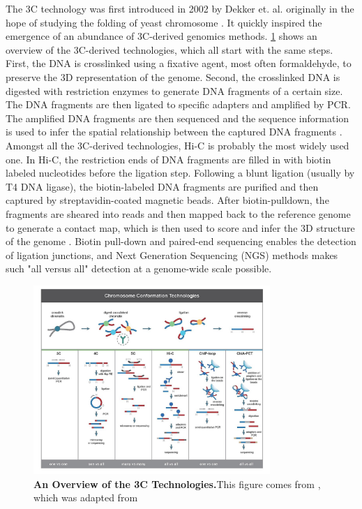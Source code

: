 \documentclass[11pt]{article}
\begin{document}
The 3C technology was first introduced in 2002 by Dekker et. al. originally in the hope of studying the folding of yeast chromosome \cite{dekker_capturing_2002}. It quickly inspired the emergence of an abundance of 3C-derived genomics methods. \cref{fig:3C} shows an overview of the 3C-derived technologies, which all start with the same steps. First, the DNA is crosslinked using a fixative agent, most often formaldehyde, to preserve the 3D representation of the genome. Second, the crosslinked DNA is digested with restriction enzymes to generate DNA fragments of a certain size. The DNA fragments are then ligated to specific adapters and amplified by PCR. The amplified DNA fragments are then sequenced and the sequence information is used to infer the spatial relationship between the captured DNA fragments \cite{wit_decade_2012}. Amongst all the 3C-derived technologies, Hi-C is probably the most widely used one. In Hi-C, the restriction ends of DNA fragments are filled in with biotin labeled nucleotides before the ligation step. Following a blunt ligation (usually by T4 DNA ligase), the biotin-labeled DNA fragments are purified and then captured by streptavidin-coated magnetic beads. After biotin-pulldown, the fragments are sheared into reads and then mapped back to the reference genome to generate a contact map, which is then used to score and infer the 3D structure of the genome \cite{wit_decade_2012}. Biotin pull-down and paired-end sequencing enables the detection of ligation junctions, and Next Generation Sequencing (NGS) methods makes such "all versus all" detection at a genome-wide scale possible.

\begin{figure}[htbp]
  \centering
  \includegraphics[width=0.8\textwidth]{assets/20221212064821.png}
  \caption{\textbf{An Overview of the 3C Technologies.}This figure comes from \cite{li_chromatin_2014}, which was adapted from \cite{wit_decade_2012}}
  \label{fig:3C}
\end{figure}
\end{document}
